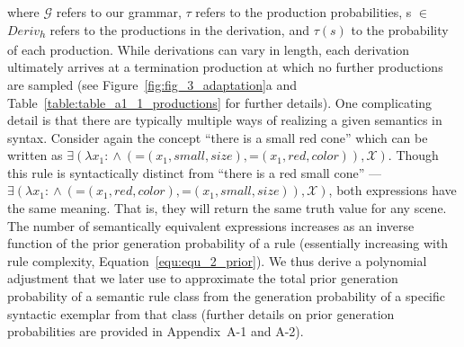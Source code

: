 \documentclass[doc,natbib,floatsintext]{apa7}
\newcommand{\xx}{\mathcal{X}} %
\begin{document}
where \(\mathcal{G}\) refers to our grammar, \(\tau\) refers to the production probabilities, s \(\in\) \(Deriv\)\textsubscript{\(h\)} refers to the productions in the derivation, and \(\tau(s)\) to the probability of each production. While derivations can vary in length, each derivation ultimately arrives at a termination production at which no further productions are sampled (see Figure~\ref{fig:fig_3_adaptation}a and Table~\ref{table:table_a1_1_productions} for further details). One complicating detail is that there are typically multiple ways of realizing a given semantics in syntax. Consider again the concept ``there is a small red cone'' which can be written as $\exists(\lambda x_{1}\!:\! \land(\text{=}(x_1, small, size), \text{=}(x_1, red, color)),\xx)$. Though this rule is syntactically distinct from ``there is a red small cone'' --- $\exists(\lambda x_{1}\!:\! \land(\text{=}(x_1, red, color),\text{=}(x_1, small, size)),\xx)$, both expressions have the same meaning. That is, they will return the same truth value for any scene. The number of semantically equivalent expressions increases as an inverse function of the prior generation probability of a rule (essentially increasing with rule complexity, Equation~\ref{equ:equ_2_prior}). We thus derive a polynomial adjustment that we later use to approximate the total prior generation probability of a semantic rule class from the generation probability of a specific syntactic exemplar from that class (further details on prior generation probabilities are provided in Appendix~A-1 and A-2).
\end{document}
